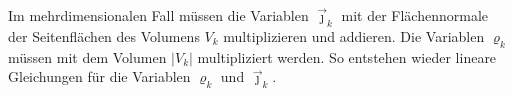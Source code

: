 Im mehrdimensionalen Fall müssen die Variablen $\vec{\jmath}_k$ mit
der Flächennormale der Seitenflächen des Volumens $V_k$ multiplizieren
und addieren.
Die Variablen $\varrho_k$ müssen mit dem Volumen $|V_k|$ multipliziert
werden.
So entstehen wieder lineare Gleichungen für die Variablen $\varrho_k$
und $\vec{\jmath}_k$.




